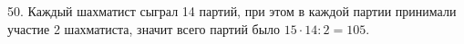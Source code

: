 50. Каждый шахматист сыграл 14 партий, при этом в каждой партии принимали участие 2 шахматиста, значит всего партий было  $15\cdot14:2=105.$\\
